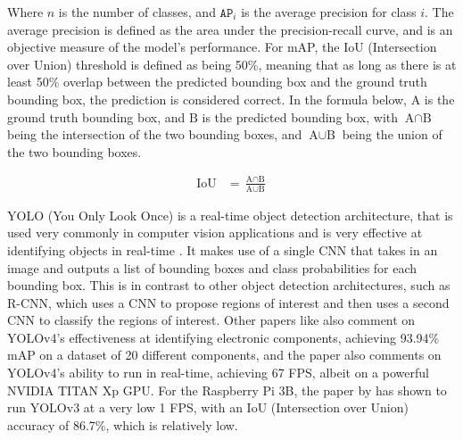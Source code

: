 Where $n$ is the number of classes, and $\texttt{AP}_i$ is the average precision for class $i$. The average precision is defined as the area under the precision-recall curve, and is an objective measure of the model's performance. For mAP, the IoU (Intersection over Union) threshold is defined as being 50\%, meaning that as long as there is at least 50\% overlap between the predicted bounding box and the ground truth bounding box, the prediction is considered correct. In the formula below, $\text{A}$ is the ground truth bounding box, and $\text{B}$ is the predicted bounding box, with $\text{A} \cap \text{B}$ being the intersection of the two bounding boxes, and $\text{A} \cup \text{B}$ being the union of the two bounding boxes.

{\fontsize{14pt}{11pt}\selectfont
\begin{align*}
    \text{IoU} &= \frac{\text{A} \cap \text{B}}{\text{A} \cup \text{B}} %
\end{align*}
}

YOLO (You Only Look Once) is a real-time object detection architecture, that is used very commonly in computer vision applications and is very effective at identifying objects in real-time \citet{yolo}. It makes use of a single CNN that takes in an image and outputs a list of bounding boxes and class probabilities for each bounding box. This is in contrast to other object detection architectures, such as R-CNN, which uses a CNN to propose regions of interest and then uses a second CNN to classify the regions of interest. Other papers like \citet{Guo2021} also comment on YOLOv4's effectiveness at identifying electronic components, achieving 93.94\% mAP on a dataset of 20 different components, and the paper also comments on YOLOv4's ability to run in real-time, achieving 67 FPS, albeit on a powerful NVIDIA TITAN Xp GPU. For the Raspberry Pi 3B, the paper by \citet{9166199} has shown to run YOLOv3 at a very low 1 FPS, with an IoU (Intersection over Union) accuracy of 86.7\%, which is relatively low.

